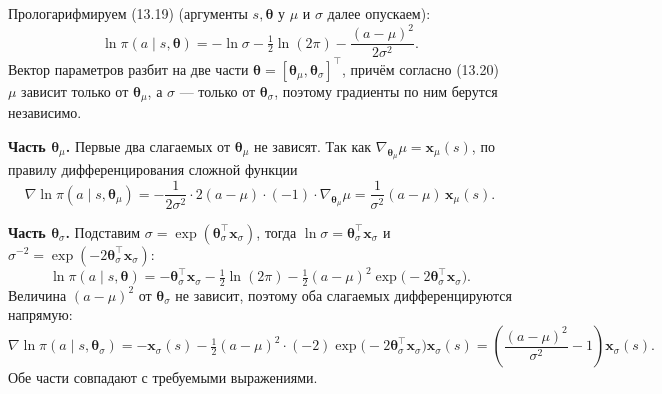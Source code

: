 \begin{solution}
    Прологарифмируем (13.19) (аргументы $s,\boldsymbol\theta$ у $\mu$ и $\sigma$ далее
    опускаем):
    \[
        \ln\pi(a\mid s,\boldsymbol\theta)
        = -\ln\sigma - \tfrac12\ln(2\pi) - \frac{(a-\mu)^2}{2\sigma^2}.
    \]
    Вектор параметров разбит на две части $\boldsymbol\theta=[\boldsymbol\theta_\mu,\boldsymbol\theta_\sigma]^\top$,
    причём согласно (13.20) $\mu$ зависит только от $\boldsymbol\theta_\mu$, а $\sigma$ ---
    только от $\boldsymbol\theta_\sigma$, поэтому градиенты по ним берутся независимо.

    \textbf{Часть $\boldsymbol\theta_\mu$.} Первые два слагаемых от $\boldsymbol\theta_\mu$
    не зависят. Так как $\nabla_{\boldsymbol\theta_\mu}\mu = \mathbf x_\mu(s)$, по правилу
    дифференцирования сложной функции
    \[
        \nabla\ln\pi(a\mid s,\boldsymbol\theta_\mu)
        = -\frac{1}{2\sigma^2}\cdot 2(a-\mu)\cdot(-1)\cdot\nabla_{\boldsymbol\theta_\mu}\mu
        = \frac{1}{\sigma^2}(a-\mu)\,\mathbf x_\mu(s).
    \]

    \textbf{Часть $\boldsymbol\theta_\sigma$.} Подставим
    $\sigma=\exp(\boldsymbol\theta_\sigma^\top\mathbf x_\sigma)$, тогда
    $\ln\sigma = \boldsymbol\theta_\sigma^\top\mathbf x_\sigma$ и
    $\sigma^{-2}=\exp(-2\boldsymbol\theta_\sigma^\top\mathbf x_\sigma)$:
    \[
        \ln\pi(a\mid s,\boldsymbol\theta)
        = -\boldsymbol\theta_\sigma^\top\mathbf x_\sigma - \tfrac12\ln(2\pi)
        - \tfrac12 (a-\mu)^2\exp\big(-2\boldsymbol\theta_\sigma^\top\mathbf x_\sigma\big).
    \]
    Величина $(a-\mu)^2$ от $\boldsymbol\theta_\sigma$ не зависит, поэтому оба слагаемых
    дифференцируются напрямую:
    \[
        \nabla\ln\pi(a\mid s,\boldsymbol\theta_\sigma)
        = -\mathbf x_\sigma(s)
        - \tfrac12 (a-\mu)^2\cdot(-2)\exp\big(-2\boldsymbol\theta_\sigma^\top\mathbf x_\sigma\big)\mathbf x_\sigma(s)
        = \left(\frac{(a-\mu)^2}{\sigma^2}-1\right)\mathbf x_\sigma(s).
    \]
    Обе части совпадают с требуемыми выражениями.
\end{solution}

